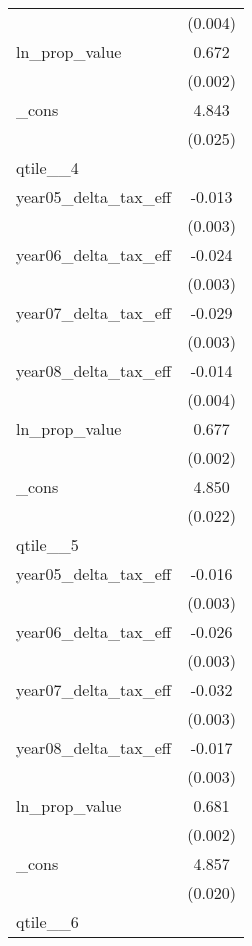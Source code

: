 {\begin{tabular}{l*{1}{c}}
            &     (0.004)         \\
[1em]
ln\_prop\_value&       0.672\sym{***}\\
            &     (0.002)         \\
[1em]
\_cons      &       4.843\sym{***}\\
            &     (0.025)         \\
\hline
qtile\_\_4    &                     \\
year05\_delta\_tax\_eff&      -0.013\sym{***}\\
            &     (0.003)         \\
[1em]
year06\_delta\_tax\_eff&      -0.024\sym{***}\\
            &     (0.003)         \\
[1em]
year07\_delta\_tax\_eff&      -0.029\sym{***}\\
            &     (0.003)         \\
[1em]
year08\_delta\_tax\_eff&      -0.014\sym{***}\\
            &     (0.004)         \\
[1em]
ln\_prop\_value&       0.677\sym{***}\\
            &     (0.002)         \\
[1em]
\_cons      &       4.850\sym{***}\\
            &     (0.022)         \\
\hline
qtile\_\_5    &                     \\
year05\_delta\_tax\_eff&      -0.016\sym{***}\\
            &     (0.003)         \\
[1em]
year06\_delta\_tax\_eff&      -0.026\sym{***}\\
            &     (0.003)         \\
[1em]
year07\_delta\_tax\_eff&      -0.032\sym{***}\\
            &     (0.003)         \\
[1em]
year08\_delta\_tax\_eff&      -0.017\sym{***}\\
            &     (0.003)         \\
[1em]
ln\_prop\_value&       0.681\sym{***}\\
            &     (0.002)         \\
[1em]
\_cons      &       4.857\sym{***}\\
            &     (0.020)         \\
\hline
qtile\_\_6    &                     \\

\end{tabular}}

